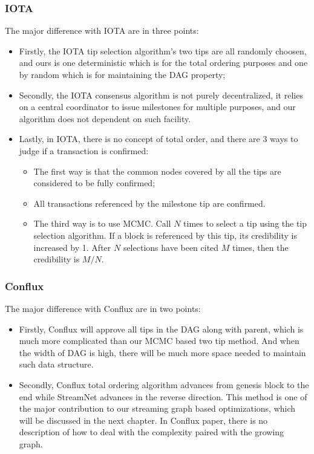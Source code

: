 \subsubsection{IOTA}
The major difference with IOTA are in three points:
\begin{itemize}
    \item Firstly, the IOTA tip selection algorithm's two tips are all randomly choosen, 
        and ours is one deterministic which is for the total ordering purposes and one by random which is for maintaining the DAG property; 
    \item Secondly, the IOTA consensus algorithm is not purely decentralized, 
        it relies on a central coordinator to issue milestones for multiple purposes, and our algorithm does not dependent on such facility. 
    \item Lastly, in IOTA, there is no concept of total order,
        and there are 3 ways to judge if a transaction is confirmed: 
    \begin{itemize}
        \item The first way is that the common nodes covered by all the tips are considered to be fully confirmed; 
        \item All transactions referenced by the milestone tip are confirmed.
        \item The third way is to use MCMC.
            Call $N$ times to select a tip using the tip selection algorithm.
            If a block is referenced by this tip, its credibility is increased by 1.
            After $N$ selections have been cited $M$ times, then the credibility is $M / N$.
    \end{itemize}
\end{itemize}

\subsubsection{Conflux}
The major difference with Conflux are in two points:
\begin{itemize}
    \item Firstly, Conflux will approve all tips in the DAG along with parent, which is much more complicated than our MCMC based two tip method. 
        And when the width of DAG is high, there will be much more space needed to maintain such data structure. 
    \item Secondly, Conflux total ordering algorithm advances from genesis block to the end while StreamNet advances in the reverse direction. 
        This method is one of the major contribution to our streaming graph based optimizations,
        which will be discussed in the next chapter. 
        In Conflux paper, there is no description of how to deal with the complexity paired with the growing graph.
\end{itemize}
